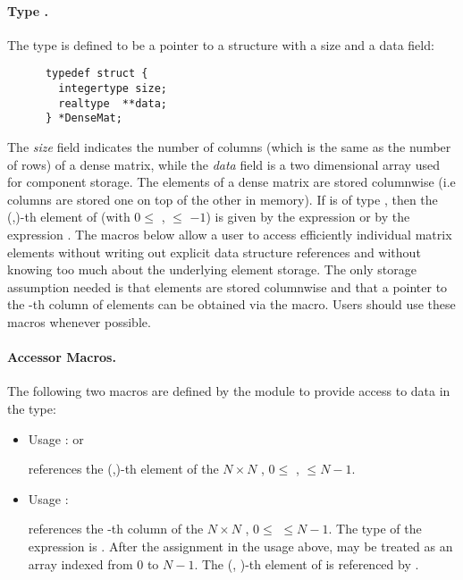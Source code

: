 %
\paragraph{Type .}
The type  is defined to be a pointer to a structure    
with a size and a data field:
\begin{verbatim}
      typedef struct {
        integertype size;
        realtype  **data;
      } *DenseMat;
\end{verbatim}
The {\em size} field indicates the number of columns (which is the same as the
number of rows) of a dense matrix, while the {\em data} field is a two 
dimensional array used for component storage. 
The elements of a dense matrix are stored columnwise (i.e columns are stored 
one on top of the other in memory). If  is of type , 
then the (,)-th element of  
(with $0 \le$ ,  $\le$ $-1$) 
is given by the expression  
or by the expression . The macros below     
allow a user to access efficiently individual matrix           
elements without writing out explicit data structure           
references and without knowing too much about the underlying   
element storage. The only storage assumption needed is that    
elements are stored columnwise and that a pointer to the -th   
column of elements can be obtained via the  macro.    
Users should use these macros whenever possible.               

\paragraph{Accessor Macros.}
The following two macros are defined by the {\dense} module to provide
access to data in the  type:
\begin{itemize}
\item {}
  \par Usage :  or
  \par {} references the (,)-th element of the $N \times N$
   , $0 \le$ ,  $\le N-1$.
  
\item {}
  \par Usage : 
  \par {} references the -th column of the $N \times N$
   , $0 \le$  $\le N-1$. The type of the expression          
   is  . After the assignment in the usage    
  above,  may be treated as an array indexed from $0$ to $N-1$. 
  The (, )-th element of  is referenced by .  
\end{itemize}

